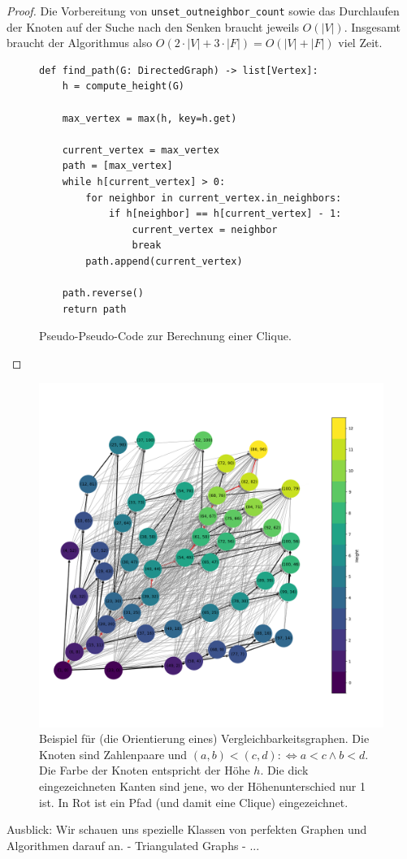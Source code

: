 \documentclass[../main.tex]{subfiles}
\begin{document}
\begin{proof}
    Die Vorbereitung von \verb|unset_outneighbor_count| sowie das Durchlaufen der Knoten auf der Suche nach den Senken braucht jeweils $O(|V|)$. Insgesamt braucht der Algorithmus also $O(2\cdot|V| + 3\cdot|F|) = O(|V| + |F|)$ viel Zeit.

    \begin{figure}[ht]
        \label{algo:clique}
        \centering
        \begin{verbatim}
def find_path(G: DirectedGraph) -> list[Vertex]:
    h = compute_height(G)

    max_vertex = max(h, key=h.get)
    
    current_vertex = max_vertex
    path = [max_vertex]
    while h[current_vertex] > 0:
        for neighbor in current_vertex.in_neighbors:
            if h[neighbor] == h[current_vertex] - 1:
                current_vertex = neighbor
                break
        path.append(current_vertex)

    path.reverse()
    return path
        \end{verbatim}
        \caption{Pseudo-Pseudo-Code zur Berechnung einer Clique.}
    \end{figure}

\end{proof}
    
\begin{figure}[ht]
    \label{fig:comparability_graph}
    \centering
    \includegraphics[width=\textwidth]{figures/comparability_graph.png}
    \caption{Beispiel für (die Orientierung eines) Vergleichbarkeitsgraphen. Die Knoten sind Zahlenpaare und $(a, b) < (c, d) :\Leftrightarrow a < c \wedge b < d$. Die Farbe der Knoten entspricht der Höhe $h$. Die dick eingezeichneten Kanten sind jene, wo der Höhenunterschied nur 1 ist. In Rot ist ein Pfad (und damit eine Clique) eingezeichnet.}
\end{figure}
    




Ausblick:
    Wir schauen uns spezielle Klassen von perfekten Graphen und Algorithmen darauf an.
        - Triangulated Graphs
        - ...
\end{document}
